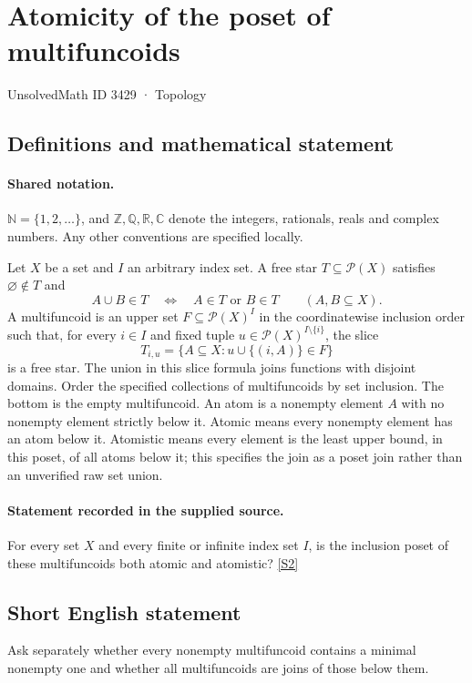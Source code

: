 \documentclass[11pt]{article}
\newcommand{\sref}[2]{\hyperlink{source:#1:#2}{[S#2]}}
\begin{document}
\setcounter{section}{3428}
\section{Atomicity of the poset of multifuncoids}\label{3429}
{\small\sffamily UnsolvedMath ID 3429 · Topology}
\subsection{Definitions and mathematical statement}

\paragraph{Shared notation.}$\mathbb N=\{1,2,\ldots\}$, and $\mathbb Z,\mathbb Q,\mathbb R,\mathbb C$ denote the integers, rationals, reals and complex numbers. Any other conventions are specified locally.


Let $X$ be a set and $I$ an arbitrary index set. A free star $T\subseteq\mathcal P(X)$ satisfies $\varnothing\notin T$ and
\[
 A\cup B\in T\quad\Longleftrightarrow\quad A\in T\text{ or }B\in T
 \qquad(A,B\subseteq X).
\]
A multifuncoid is an upper set $F\subseteq\mathcal P(X)^I$ in the coordinatewise inclusion order such that, for every $i\in I$ and fixed tuple $u\in\mathcal P(X)^{I\setminus\{i\}}$, the slice
\[
 T_{i,u}=\{A\subseteq X:u\cup\{(i,A)\}\in F\}
\]
is a free star. The union in this slice formula joins functions with disjoint domains.
Order the specified collections of multifuncoids by set inclusion. The bottom is the empty multifuncoid. An atom is a nonempty element $A$ with no nonempty element strictly below it. Atomic means every nonempty element has an atom below it. Atomistic means every element is the least upper bound, in this poset, of all atoms below it; this specifies the join as a poset join rather than an unverified raw set union.
\paragraph{Statement recorded in the supplied source.}
For every set $X$ and every finite or infinite index set $I$, is the inclusion poset of these multifuncoids both atomic and atomistic? \sref{3429}{2}
\subsection{Short English statement}
Ask separately whether every nonempty multifuncoid contains a minimal nonempty one and whether all multifuncoids are joins of those below them.
\end{document}
